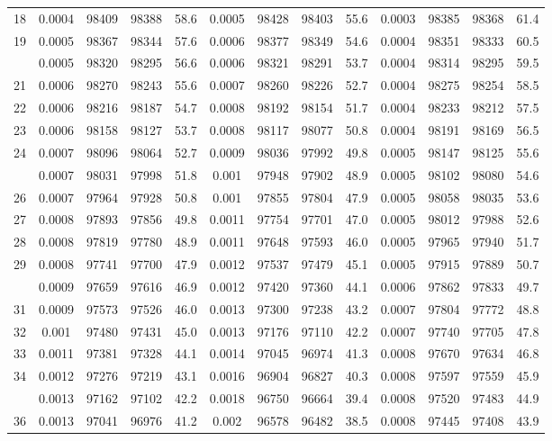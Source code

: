 \documentclass[
  14pt,
]{article}
\begin{document}
\begin{longtable}[t]{lcccccccccccc}
18 & 0.0004 & 98409 & 98388 & 58.6 & 0.0005 & 98428 & 98403 & 55.6 & 0.0003 & 98385 & 98368 & 61.4\\
19 & 0.0005 & 98367 & 98344 & 57.6 & 0.0006 & 98377 & 98349 & 54.6 & 0.0004 & 98351 & 98333 & 60.5\\
\addlinespace
20 & 0.0005 & 98320 & 98295 & 56.6 & 0.0006 & 98321 & 98291 & 53.7 & 0.0004 & 98314 & 98295 & 59.5\\
21 & 0.0006 & 98270 & 98243 & 55.6 & 0.0007 & 98260 & 98226 & 52.7 & 0.0004 & 98275 & 98254 & 58.5\\
22 & 0.0006 & 98216 & 98187 & 54.7 & 0.0008 & 98192 & 98154 & 51.7 & 0.0004 & 98233 & 98212 & 57.5\\
23 & 0.0006 & 98158 & 98127 & 53.7 & 0.0008 & 98117 & 98077 & 50.8 & 0.0004 & 98191 & 98169 & 56.5\\
24 & 0.0007 & 98096 & 98064 & 52.7 & 0.0009 & 98036 & 97992 & 49.8 & 0.0005 & 98147 & 98125 & 55.6\\
\addlinespace
25 & 0.0007 & 98031 & 97998 & 51.8 & 0.001 & 97948 & 97902 & 48.9 & 0.0005 & 98102 & 98080 & 54.6\\
26 & 0.0007 & 97964 & 97928 & 50.8 & 0.001 & 97855 & 97804 & 47.9 & 0.0005 & 98058 & 98035 & 53.6\\
27 & 0.0008 & 97893 & 97856 & 49.8 & 0.0011 & 97754 & 97701 & 47.0 & 0.0005 & 98012 & 97988 & 52.6\\
28 & 0.0008 & 97819 & 97780 & 48.9 & 0.0011 & 97648 & 97593 & 46.0 & 0.0005 & 97965 & 97940 & 51.7\\
29 & 0.0008 & 97741 & 97700 & 47.9 & 0.0012 & 97537 & 97479 & 45.1 & 0.0005 & 97915 & 97889 & 50.7\\
\addlinespace
30 & 0.0009 & 97659 & 97616 & 46.9 & 0.0012 & 97420 & 97360 & 44.1 & 0.0006 & 97862 & 97833 & 49.7\\
31 & 0.0009 & 97573 & 97526 & 46.0 & 0.0013 & 97300 & 97238 & 43.2 & 0.0007 & 97804 & 97772 & 48.8\\
32 & 0.001 & 97480 & 97431 & 45.0 & 0.0013 & 97176 & 97110 & 42.2 & 0.0007 & 97740 & 97705 & 47.8\\
33 & 0.0011 & 97381 & 97328 & 44.1 & 0.0014 & 97045 & 96974 & 41.3 & 0.0008 & 97670 & 97634 & 46.8\\
34 & 0.0012 & 97276 & 97219 & 43.1 & 0.0016 & 96904 & 96827 & 40.3 & 0.0008 & 97597 & 97559 & 45.9\\
\addlinespace
35 & 0.0013 & 97162 & 97102 & 42.2 & 0.0018 & 96750 & 96664 & 39.4 & 0.0008 & 97520 & 97483 & 44.9\\
36 & 0.0013 & 97041 & 96976 & 41.2 & 0.002 & 96578 & 96482 & 38.5 & 0.0008 & 97445 & 97408 & 43.9\\

\end{longtable}
\end{document}
